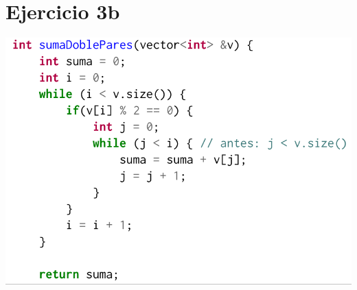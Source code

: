 \documentclass[12 pt]{article}
\begin{document}
\newpage

\section*{Ejercicio 3b}
    \begin{center}
        \includegraphics[width=0.7 \linewidth]{img/ej3b.png}
    \end{center}
\end{document}
